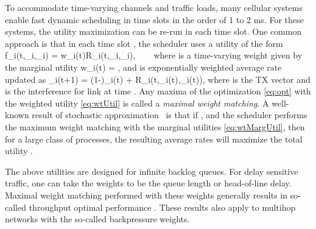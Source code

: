 \documentclass[letterpaper,twocolumn,twoside]{IEEEtran}
\def\beq{}
\newcommand{\xbf}{\mathbf{x}}
\newcommand{\xbfhat}{\widehat{\mathbf{x}}}
\newcommand{\zbf}{\mathbf{z}}
\newcommand{\zbfhat}{\widehat{\mathbf{z}}}
\newcommand{\Rbar}{\overline{R}}
\begin{document}
To accommodate time-varying channels and traffic loads,
many cellular systems enable fast dynamic scheduling in time slots
in the order of 1 to 2 ms.  For these systems, the utility maximization can be
re-run in each time slot.  One common approach is that
in each time slot ,
the scheduler uses a utility of the form
\beq \label{eq:wtUtil}
   f_i(t,\xbf_i,\zbf_i) = w_i(t)R_i(t,\xbf_i,\zbf_i), \ \ \
\eeq
where  is a time-varying weight given by the marginal utility
\beq \label{eq:wtMargUtil}
   w_i(t) = \frac{\partial U_i(\Rbar_i(t))}{\partial R},
\eeq and  is exponentially weighted average rate updated
as \beq \label{eq:rateFilt}
    \Rbar_i(t+1) = (1-\alpha)\Rbar_i(t) + \alpha
    R_i(t,\xbfhat_i(t),\zbfhat_i(t)),
\eeq
where  is the TX vector and   is
the interference for link  at time . Any maxima of the
optimization \eqref{eq:opt} with the weighted utility
\eqref{eq:wtUtil} is called a \emph{maximal weight matching}. A
well-known result of stochastic approximation~\cite{stolyar_2005} is
that if , and the scheduler performs the maximum
weight matching with the marginal utilities \eqref{eq:wtMargUtil},
then for a large class of processes, the resulting average rates
will maximize the total utility .

The above utilities are designed for infinite backlog queues.
For delay sensitive traffic, one can take the weights  to be the queue length
or head-of-line delay.  Maximal weight matching performed with these weights
generally results in so-called throughput optimal performance \cite{TassiulasE:92}.
These results also apply to multihop networks with the so-called backpressure
weights.
\end{document}
